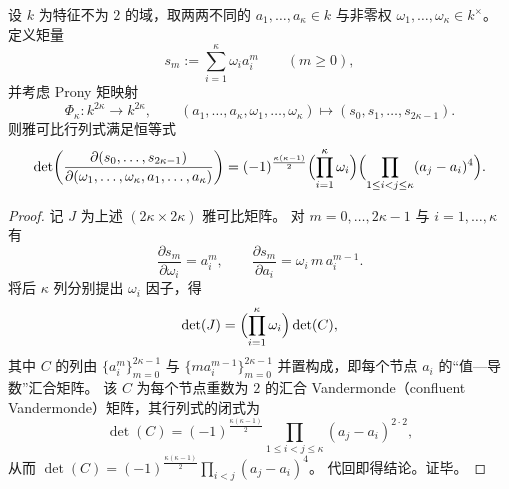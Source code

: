 \begin{theorem}\label{thm:xi-prony-moment-map-jacobian-delta4}
设 \(k\) 为特征不为 \(2\) 的域，取两两不同的 \(a_1,\dots,a_\kappa\in k\) 与非零权 \(\omega_1,\dots,\omega_\kappa\in k^{\times}\)。
定义矩量
\[
s_m:=\sum_{i=1}^{\kappa}\omega_i a_i^{m}\qquad(m\ge 0),
\]
并考虑 Prony 矩映射
\[
\Phi_{\kappa}:k^{2\kappa}\longrightarrow k^{2\kappa},\qquad
(a_1,\dots,a_\kappa,\omega_1,\dots,\omega_\kappa)\longmapsto (s_0,s_1,\dots,s_{2\kappa-1}).
\]
则雅可比行列式满足恒等式
\[
\det\!\left(\frac{\partial(s_0,\dots,s_{2\kappa-1})}{\partial(\omega_1,\dots,\omega_\kappa,a_1,\dots,a_\kappa)}\right)
=
(-1)^{\frac{\kappa(\kappa-1)}2}
\Bigl(\prod_{i=1}^{\kappa}\omega_i\Bigr)
\Bigl(\prod_{1\le i<j\le \kappa}(a_j-a_i)^4\Bigr).
\]
\end{theorem}
\begin{proof}
记 \(J\) 为上述 \((2\kappa\times 2\kappa)\) 雅可比矩阵。
对 \(m=0,\dots,2\kappa-1\) 与 \(i=1,\dots,\kappa\) 有
\[
\frac{\partial s_m}{\partial \omega_i}=a_i^{m},
\qquad
\frac{\partial s_m}{\partial a_i}=\omega_i\,m\,a_i^{m-1}.
\]
将后 \(\kappa\) 列分别提出 \(\omega_i\) 因子，得
\[
\det(J)=\Bigl(\prod_{i=1}^{\kappa}\omega_i\Bigr)\det(C),
\]
其中 \(C\) 的列由 \(\{a_i^{m}\}_{m=0}^{2\kappa-1}\) 与 \(\{m a_i^{m-1}\}_{m=0}^{2\kappa-1}\) 并置构成，即每个节点 \(a_i\) 的“值—导数”汇合矩阵。
该 \(C\) 为每个节点重数为 \(2\) 的汇合 Vandermonde（confluent Vandermonde）矩阵，其行列式的闭式为
\[
\det(C)=(-1)^{\frac{\kappa(\kappa-1)}2}\prod_{1\le i<j\le \kappa}(a_j-a_i)^{2\cdot 2},
\]
从而
\(
\det(C)=(-1)^{\frac{\kappa(\kappa-1)}2}\prod_{i<j}(a_j-a_i)^4
\)。
代回即得结论。证毕。
\end{proof}

